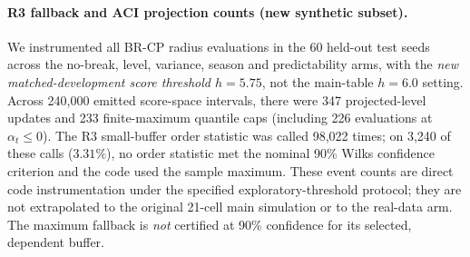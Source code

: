 \documentclass[10pt]{article}
\begin{document}
\paragraph{R3 fallback and ACI projection counts (new synthetic subset).}
We instrumented all BR-CP radius evaluations in the $60$ held-out test seeds
across the no-break, level, variance, season and predictability arms, with the
\emph{new matched-development score threshold $h=5.75$}, not the main-table
$h=6.0$ setting. Across 240,000 emitted score-space intervals, there were
347 projected-level updates and 233 finite-maximum quantile caps (including
226 evaluations at $\alpha_t\le0$). The R3 small-buffer order statistic was
called 98,022 times; on 3,240 of these calls ($3.31\%$), no order statistic
met the nominal 90\% Wilks confidence criterion and the code used the
sample maximum. These event counts are direct code instrumentation under the
specified exploratory-threshold protocol; they are not extrapolated to the
original 21-cell main simulation or to the real-data arm. The maximum fallback
is \emph{not} certified at 90\% confidence for its selected, dependent buffer.
\end{document}

